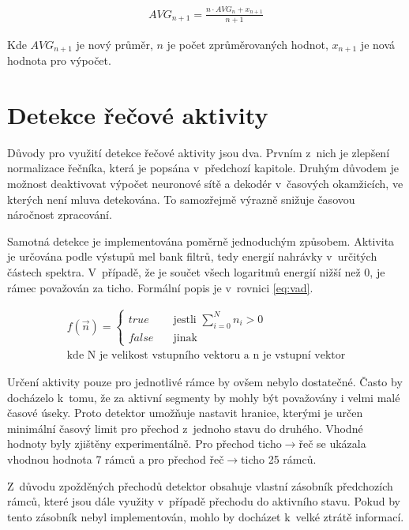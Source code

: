 \begin{equation} \label{eq:moving_average}
\begin{gathered}
AVG_{n + 1} = \frac{n\cdot AVG_{n} + x_{n + 1}}{n + 1}
\end{gathered}
\end{equation}

Kde $AVG_{n + 1}$ je nový průměr, $n$ je počet zprůměrovaných hodnot, $x_{n + 1}$ je nová hodnota pro výpočet.

\section{Detekce řečové aktivity}\label{sec:imple_vad}
Důvody pro využití detekce řečové aktivity jsou dva. Prvním z~nich je zlepšení normalizace řečníka, která je popsána v~předchozí kapitole. Druhým důvodem je možnost deaktivovat výpočet neuronové sítě a dekodér v~časových okamžicích, ve kterých není mluva detekována. To samozřejmě výrazně snižuje časovou náročnost zpracování.

Samotná detekce je implementována poměrně jednoduchým způsobem. Aktivita je určována podle výstupů mel bank filtrů, tedy energií nahrávky v~určitých částech spektra. V~případě, že je součet všech logaritmů energií nižší než 0, je rámec považován za ticho. Formální popis je v~rovnici \ref{eq:vad}.

\begin{equation} \label{eq:vad}
\begin{gathered}
f(\vec{n}) =
  \begin{cases}
    true       & \quad \text{jestli }\sum^N_{i = 0} n_i > 0\\
    false  & \quad \text{jinak} 
  \end{cases}
\\
\text{kde N je velikost vstupního vektoru a n je vstupní vektor}
\end{gathered}
\end{equation}

Určení aktivity pouze pro jednotlivé rámce by ovšem nebylo dostatečné. Často by docházelo k~tomu, že za aktivní segmenty by mohly být považovány i velmi malé časové úseky. Proto detektor umožňuje nastavit hranice, kterými je určen minimální časový limit pro přechod z~jednoho stavu do druhého. Vhodné hodnoty byly zjištěny experimentálně. Pro přechod ticho$\rightarrow$řeč se ukázala vhodnou hodnota 7 rámců a pro přechod řeč$\rightarrow$ticho 25 rámců.

Z~důvodu zpožděných přechodů detektor obsahuje vlastní zásobník předchozích rámců, které jsou dále využity v~případě přechodu do aktivního stavu. Pokud by tento zásobník nebyl implementován, mohlo by docházet k~velké ztrátě informací.

